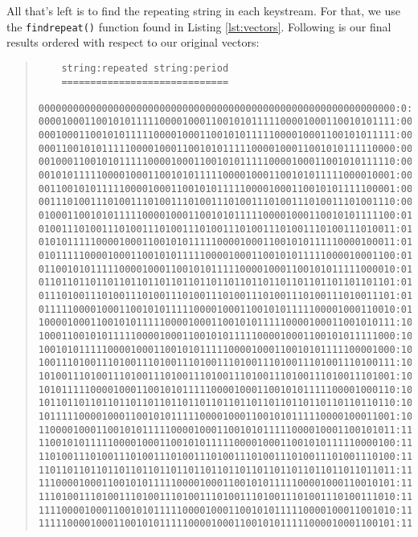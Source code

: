 \documentclass[10pt,letterpaper]{report}
\begin{document}
\begin{enumerate}
	All that's left is to find the repeating string in each keystream.
	For that, we use the \verb|findrepeat()| function found in
	Listing \ref{lst:vectors}. Following is our final results ordered with respect
	to our original vectors:
	\begin{quote}
	\begin{verbatim}
	string:repeated string:period
	=============================
	00000000000000000000000000000000000000000000000000000000000000:0:1
00001000110010101111100001000110010101111100001000110010101111:000010001100101011111:21
00010001100101011111000010001100101011111000010001100101011111:000100011001010111110:21
00011001010111110000100011001010111110000100011001010111110000:000110010101111100001:21
00100011001010111110000100011001010111110000100011001010111110:001000110010101111100:21
00101011111000010001100101011111000010001100101011111000010001:001010111110000100011:21
00110010101111100001000110010101111100001000110010101111100001:001100101011111000010:21
00111010011101001110100111010011101001110100111010011101001110:0011101:7
01000110010101111100001000110010101111100001000110010101111100:010001100101011111000:21
01001110100111010011101001110100111010011101001110100111010011:0100111:7
01010111110000100011001010111110000100011001010111110000100011:010101111100001000110:21
01011111000010001100101011111000010001100101011111000010001100:010111110000100011001:21
01100101011111000010001100101011111000010001100101011111000010:011001010111110000100:21
01101101101101101101101101101101101101101101101101101101101101:011:3
01110100111010011101001110100111010011101001110100111010011101:0111010:7
01111100001000110010101111100001000110010101111100001000110010:011111000010001100101:21
10000100011001010111110000100011001010111110000100011001010111:100001000110010101111:21
10001100101011111000010001100101011111000010001100101011111000:100011001010111110000:21
10010101111100001000110010101111100001000110010101111100001000:100101011111000010001:21
10011101001110100111010011101001110100111010011101001110100111:1001110:7
10100111010011101001110100111010011101001110100111010011101001:1010011:7
10101111100001000110010101111100001000110010101111100001000110:101011111000010001100:21
10110110110110110110110110110110110110110110110110110110110110:101:3
10111110000100011001010111110000100011001010111110000100011001:101111100001000110010:21
11000010001100101011111000010001100101011111000010001100101011:110000100011001010111:21
11001010111110000100011001010111110000100011001010111110000100:110010101111100001000:21
11010011101001110100111010011101001110100111010011101001110100:1101001:7
11011011011011011011011011011011011011011011011011011011011011:110:3
11100001000110010101111100001000110010101111100001000110010101:111000010001100101011:21
11101001110100111010011101001110100111010011101001110100111010:1110100:7
11110000100011001010111110000100011001010111110000100011001010:111100001000110010101:21
11111000010001100101011111000010001100101011111000010001100101:111110000100011001010:21
	\end{verbatim}
	\end{quote}
	

\end{enumerate}
\end{document}
